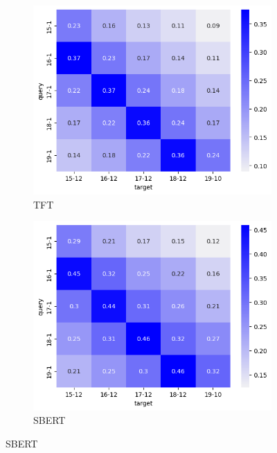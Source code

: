 \begin{figure}[h]
    \begin{subfigure}{0.48\linewidth}
    \includegraphics[width=\linewidth]{stylometryExtensions/figures/heat/tft.png}
    \caption{TFT}
    \label{fig:tempral_vary:tft}
    \end{subfigure}
    \begin{subfigure}{0.48\linewidth}
    \includegraphics[width=\linewidth]{stylometryExtensions/figures/heat/sbert.png}
    \caption{SBERT}
    \label{fig:tempral_vary:sbert}
    \end{subfigure}


\end{figure}
